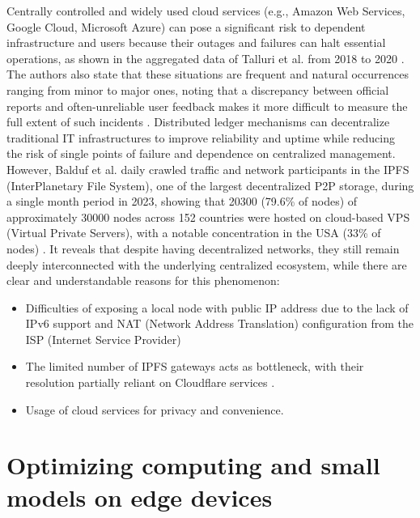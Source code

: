 Centrally controlled and widely used cloud services (e.g., Amazon Web Services, Google Cloud, Microsoft Azure) can pose a significant risk to dependent infrastructure and users because their outages and failures can halt essential operations, as shown in the aggregated data of Talluri et al. from 2018 to 2020 \cite{talluri2026cloud}. The authors also state that these situations are frequent and natural occurrences ranging from minor to major ones, noting that a discrepancy between official reports and often-unreliable user feedback makes it more difficult to measure the full extent of such incidents \cite[pp. 5–7]{talluri2026cloud}. Distributed ledger mechanisms can decentralize traditional IT infrastructures to improve reliability and uptime while reducing the risk of single points of failure and dependence on centralized management. However, Balduf et al. daily crawled traffic and network participants in the IPFS (InterPlanetary File System), one of the largest decentralized P2P storage, during a single month period in 2023, showing that 20300 (79.6\% of nodes) of approximately 30000 nodes across 152 countries were hosted on cloud-based VPS (Virtual Private Servers), with a notable concentration in the USA (33\% of nodes) \cite{balduf2023cloud}. It reveals that despite having decentralized networks, they still remain deeply interconnected with the underlying centralized ecosystem, while there are clear and understandable reasons for this phenomenon:
\begin{itemize}
    \item Difficulties of exposing a local node with public IP address due to the lack of IPv6 support and NAT (Network Address Translation) configuration from the ISP (Internet Service Provider) \cite[p. 6]{balduf2023cloud}
    \item The limited number of IPFS gateways acts as bottleneck, with their resolution partially reliant on Cloudflare services \cite[pp. 3, 11]{balduf2023cloud}.
    \item Usage of cloud services for privacy and convenience.
\end{itemize}

\section{Optimizing computing and small models on edge devices}

